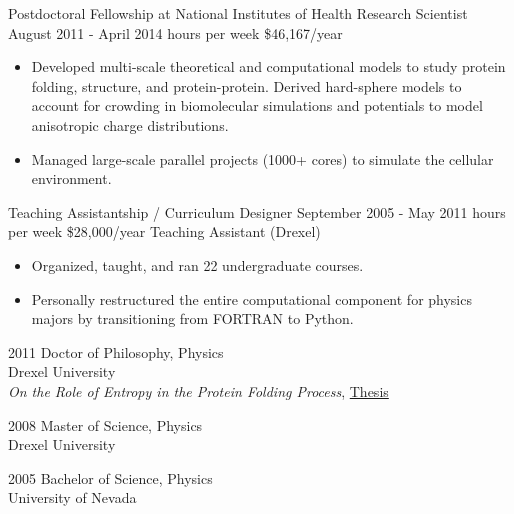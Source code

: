 \documentclass[]{scrartcl}
\begin{document}
\begin{cleanCV}

\WorkExperience
{}
{Postdoctoral Fellowship at National Institutes of Health}
{\newline Research Scientist}
{
  \newline August 2011 - April 2014
   hours per week
  \newline \$46,167/year
}
{
  \begin{itemize}
  \item Developed multi-scale theoretical and computational models to study protein folding, structure, and protein-protein. Derived hard-sphere models to account for crowding in biomolecular simulations and potentials to model anisotropic charge distributions.
  \item Managed large-scale parallel projects (1000+ cores) to simulate the cellular environment.
  \end{itemize}
}

\WorkExperience{}
{\newline Teaching Assistantship / Curriculum Designer}
{
  \newline September 2005 - May 2011
   hours per week
  \newline \$28,000/year
}   
{Teaching Assistant (Drexel)}

{
  \begin{itemize}
  \item   Organized, taught, and ran 22 undergraduate courses.
  \item   Personally restructured the entire computational component for physics majors by transitioning from FORTRAN to Python.
  \end{itemize}
}




\WorkExperience
{2011}
{Doctor of Philosophy, Physics}
{
\\Drexel University
\\\emph{On the Role of Entropy in the Protein Folding Process}, \href{https://idea.library.drexel.edu/islandora/object/idea:3488}{Thesis}
}

\WorkExperience
{2008}
{Master of Science, Physics}
{\\Drexel University}

\WorkExperience
{2005}
{Bachelor of Science, Physics}
{\\University of Nevada}


\end{cleanCV}
\end{document}
